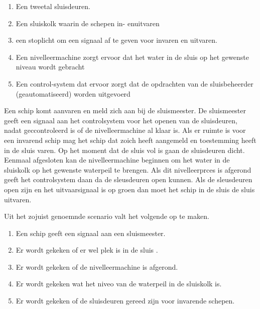 \begin{enumerate}
	\item Een tweetal sluisdeuren. 
	\item Een sluiskolk waarin de schepen in- enuitvaren
	\item een stoplicht om een signaal af te geven voor invaren en uitvaren.
	\item Een nivelleermachine zorgt ervoor dat het water in de sluis op het gewenste niveau wordt gebracht
	\item Een control-system dat ervoor zorgt dat de opdrachten van de sluisbeheerder (geautomatiseerd) worden uitgevoerd
\end{enumerate}

Een schip komt aanvaren en meld zich aan bij de sluismeester. De sluismeester geeft een signaal aan het controlsystem voor het openen van de sluisdeuren, nadat geccontroleerd is of de nivelleermachine al klaar is. Als er ruimte is voor een invarend schip mag het schip dat zoich heeft aangemeld en toestemming heeft  in de sluis varen. Op het moment dat de sluis vol is gaan de sluisdeuren dicht. Eenmaal afgesloten kan de nivelleermachine beginnen om het water in de sluiskolk op het gewenste waterpeil te brengen. Als dit nivelleerprces is afgerond geeft  het controlsystem daan da de sleusdeuren open kunnen.  Als de sleusdeuren open zijn en het uitvaarsignaal is op groen dan moet het schip in de sluis de sluis uitvaren.

Uit het zojuist genoemnde scenario valt het volgende op te maken.
\begin{enumerate}
	\item Een schip geeft een signaal aan een sluismeester.
	\item Er wordt gekeken of er wel plek is in de sluis .
	\item Er wordt gekeken of de nivelleermachine is afgerond.
	\item Er wordt gekeken wat het niveo van de waterpeil in de sluiskolk is.
	\item Er wordt gekeken of de sluisdeuren gereed zijn voor invarende schepen.
\end{enumerate}







